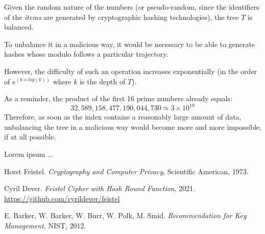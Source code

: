 \documentclass[twoside,twocolumn]{article}
\theoremstyle{definition}
\theoremstyle{remark}
\begin{document}
Given the random nature of the numbers (or pseudo-random, since the identifiers of the \emph{items} are generated by cryptographic hashing 
technologies), the tree $T$ is balanced.

To unbalance it in a malicious way, it would be necessary to be able to generate hashes whose modulo follows a particular trajectory.

However, the difficulty of such an operation increases exponentially (in the order of $e^{\left(k \times log(k) \right)}$ where $k$ is the depth of 
$T$).

As a reminder, the product of the first 16 prime numbers already equals: $$
    32,589,158,477,190,044,730 \simeq 3 \times 10^{19}
$$
Therefore, as soon as the index contains a reasonably large amount of data, unbalancing the tree in a malicious way would become more and more 
impossible, if at all possible.


Lorem ipsum ...



\begin{thebibliography}{99} %

Horst Feistel. \emph{Cryptography and Computer Privacy}, Scientific American, 1973.

Cyril Dever. \emph{Feistel Cipher with Hash Round Function}, 2021.
\\\small\url{https://github.com/cyrildever/feistel}

E. Barker, W. Barker, W. Burr, W. Polk, M. Smid. \emph{Recommendation for Key Management}, NIST, 2012.

\end{thebibliography}

\end{document}
